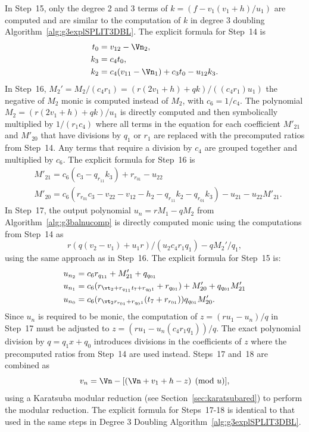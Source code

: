 In Step~15, only the degree 2 and 3 terms of $k = (f - v_1(v_1 + h)/u_1)$ are
computed and are similar to the computation of $k$ in degree 3 doubling
Algorithm~\ref{alg:g3explSPLIT3DBL}. The explicit formula for Step~14 is
\begin{align*}
    t_0 &= v_{12} - \Vn_2,\\
    k_3 &= c_4t_0,\\
    k_2 &= c_4(v_{11} - \Vn_1) + c_3t_0 - u_{12}k_3.
\end{align*}
In Step~16, $M_2' = M_2/(c_4r_1) = (r(2v_1 + h) + qk)/((c_4r_1)u_1)$ the
negative of $M_2$ monic is computed instead of $M_2$, with $c_6 = 1/c_4$. The
polynomial $M_2 = (r(2v_1 + h) + qk)/u_1$ is directly computed and then
symbolically multiplied by $1/(r_1c_4)$ where all terms in the equation for each
coefficient $M'_{21}$ and $M'_{20}$ that have divisions by $q_1$ or $r_1$ are
replaced with the precomputed ratios from Step~14. Any terms that require a
division by $c_4$ are grouped together and multiplied by $c_6$. The explicit
formula for Step~16 is  
\begin{align*} 
    & M'_{21} = c_6(c_3 - q_{r_{11}}k_3) + r_{r_{01}} - u_{22}    \\
    & M'_{20} = c_6(r_{r_{01}}c_3 - v_{22} - v_{12} - h_2 - q_{r_{11}}k_2 - q_{r_{01}}k_3) - u_{21} - u_{22}M'_{21}.
\end{align*}
In Step~17, the output polynomial $u_n = rM_1 - qM_2$ from
Algorithm~\ref{alg:g3balnucomp} is directly computed monic using the
computations from Step~14 as  $$r(q(v_2 - v_1) + u_1r)/(u_2c_4r_1q_1) -
qM_2'/q_1,$$ using the same approach as in Step~16. The explicit formula for
Step~15 is: 
\begin{align*} 
    & u_{n_2} = c_6r_{q_{11}} + M'_{21} + q_{q_{01}}          \\
    & u_{n_1} = c_6(r_{\vt_2 + r_{q_{11}}t_7 + r_{q_01}} + r_{q_{01}}) + M'_{20} + q_{q_{01}}M'_{21}    \\
    & u_{n_0} = c_6(r_{\vt_2r_{r_{01}} + r_{q_01}}(t_7 + r_{r_{01}})) q_{q_{01}}M'_{20}.
\end{align*}
Since $u_n$ is required to be monic, the computation of $z = (ru_1 - u_n)/q$ in
Step~17 must be adjusted to $z = (ru_1 - u_n(c_4r_1q_1))/q$. The exact
polynomial division by $q = q_1x + q_0$ introduces divisions in the coefficients
of $z$ where the precomputed ratios from Step~14 are used instead. Steps~17
and~18 are combined as $$v_n = \Vn - [(\Vn + v_1 + h - z) \pmod{u}],$$ using a
Karatsuba modular reduction (see Section~\ref{sec:karatsubared}) to perform the
modular reduction. The explicit formula for Steps~17-18 is identical to that used in the same
steps in Degree 3 Doubling Algorithm~\ref{alg:g3explSPLIT3DBL}. 

